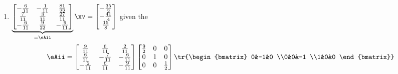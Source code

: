 \begin{exercise}
\begin{enumerate}
\item \(\underbrace{\begin{bmatrix} -\frac{6}{11}&-\frac{1}{11}&\frac{81}{22}
\\\frac{7}{11}&\frac{3}{11}&\frac{27}{11}
\\-\frac{6}{11}&\frac{9}{22}&-\frac{9}{11} \end{bmatrix}}_{=\eAii}\xv
=\begin{bmatrix} -\frac{35}{2}
\\-\frac{41}{4}
\\\frac{15}{8} \end{bmatrix}\) given the \svd
\begin{equation*}
\eAii=\begin{bmatrix} \frac{9}{11}&\frac{6}{11}&\frac{2}{11}
\\\frac{6}{11}&-\frac{7}{11}&-\frac{6}{11}
\\-\frac{2}{11}&\frac{6}{11}&-\frac{9}{11} \end{bmatrix}
\begin{bmatrix} \frac{9}{2}&0&0
\\0&1&0
\\0&0&\frac{1}{2} \end{bmatrix}
\tr{\begin{bmatrix} 0&-1&0
\\0&0&-1
\\1&0&0 \end{bmatrix}}
\end{equation*}


\end{enumerate}
\end{exercise}



